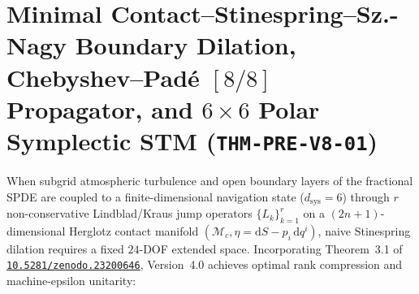 \documentclass[11pt,a4paper,reqno]{article}
\newcommand{\zenodo}[1]{\mbox{\href{https://doi.org/10.5281/zenodo.#1}{\texttt{10.5281/zenodo.#1}}}}
\theoremstyle{plain}
\theoremstyle{definition}
\theoremstyle{remark}
\numberwithin{equation}{section}
\begin{document}
\section{Minimal Contact--Stinespring--Sz.-Nagy Boundary Dilation, Chebyshev--Pad\'e \texorpdfstring{$[8/8]$}{[8/8]} Propagator, and \texorpdfstring{$6\times 6$}{6x6} Polar Symplectic STM (\texttt{THM-PRE-V8-01})}
\label{sec:minimal_stinespring_spde_v4}

When subgrid atmospheric turbulence and open boundary layers of the fractional SPDE are coupled to a finite-dimensional navigation state ($d_{\mathrm{sys}} = 6$) through $r$ non-conservative Lindblad/Kraus jump operators $\{L_k\}_{k=1}^r$ on a $(2n+1)$-dimensional Herglotz contact manifold $(\mathcal{M}_c, \eta = \mathrm{d}S - p_i\,\mathrm{d}q^i)$, naive Stinespring dilation requires a fixed $24$-DOF extended space. Incorporating Theorem~3.1 of \zenodo{23200646}, Version~4.0 achieves optimal rank compression and machine-epsilon unitarity:
\end{document}
